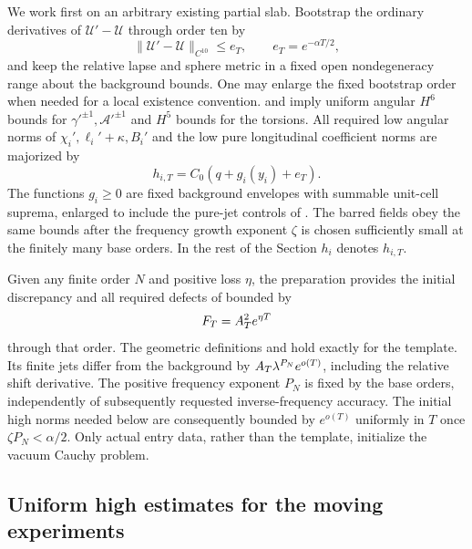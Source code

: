We work first on an arbitrary existing partial slab.  Bootstrap the
ordinary derivatives of $\mathcal U'-\mathcal U$ through order ten by
\begin{equation}\label{dn:bootstrap}
 \|\mathcal U'-\mathcal U\|_{C^{10}}\le e_T,
                   \qquad e_T=e^{-\alpha T/2},
\end{equation}
and keep the relative lapse and sphere metric in a fixed open
nondegeneracy range about the background bounds.  One may enlarge the
fixed bootstrap order when needed for a local existence convention.
 and  imply uniform angular
$H^6$ bounds for $\gamma'^{\pm1},\mathcal A'^{\pm1}$ and $H^5$ bounds
for the torsions.  All required low angular norms of
$\chi_i',\ell_i'+\kappa,B_i'$ and the low pure longitudinal
coefficient norms are majorized by
\begin{equation}\label{dn:majorants}
 h_{i,T}=C_0(q+g_i(y_i)+e_T).
\end{equation}
The functions $g_i\ge0$ are fixed background envelopes with summable
unit-cell suprema, enlarged to include the pure-jet controls of
\cite[]{KerrCTwo}.  The barred fields obey the same
bounds after the frequency growth exponent $\zeta$ is chosen
sufficiently small at the finitely many base orders.  In the rest
of the Section $h_i$ denotes $h_{i,T}$.

Given any finite order $N$ and positive loss $\eta$, the preparation
provides the initial discrepancy and all required defects of
 bounded by
\begin{equation}\label{dn:input-defect}
 F_T=A_T^2e^{\eta T}
\end{equation}
through that order.  The geometric definitions and
 hold exactly for the template.  Its
finite jets differ from the background by
$A_T\lambda^{P_N}e^{o(T)}$, including the relative shift derivative.
The positive frequency exponent $P_N$ is fixed by the base orders,
independently of subsequently requested inverse-frequency accuracy.
The initial high norms needed below are consequently bounded by
$e^{o(T)}$ uniformly in $T$ once $\zeta P_N<\alpha/2$.
Only actual entry data, rather than the template, initialize the
vacuum Cauchy problem.

\subsection{Uniform high estimates for the moving experiments}

